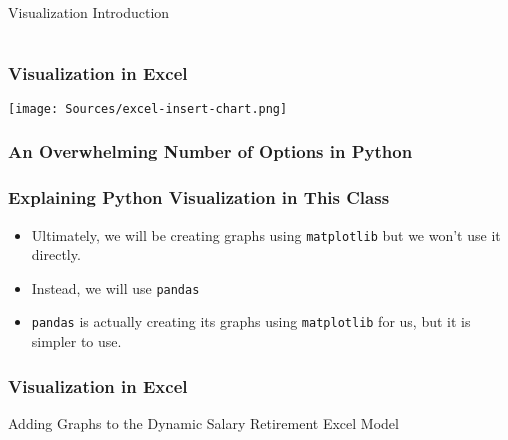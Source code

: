 \documentclass[handout, 11pt]{beamer}
\begin{document}
\begin{section}[Intro]{Visualization Introduction}
\begin{frame}
\begin{center}
\begin{tabular}{lcc}
\end{tabular}
\end{center}
\end{frame}
\begin{frame}
\frametitle{Visualization in Excel}
\begin{center}
\begin{adjustbox}{width=0.9\textwidth, height=0.8\textheight, keepaspectratio}
\texttt{[image: Sources/excel-insert-chart.png]}
\end{adjustbox}
\end{center}
\end{frame}
\begin{frame}
\frametitle{An Overwhelming Number of Options in Python}
\begin{center}
\begin{adjustbox}{width=0.9\textwidth, height=0.8\textheight, keepaspectratio}
\end{adjustbox}
\end{center}
\end{frame}
\begin{frame}
\frametitle{Explaining Python Visualization in This Class}
\begin{itemize}
\item Ultimately, we will be creating graphs using
\texttt{matplotlib}
but we won't use it directly.
\vfill
\item Instead, we will use
\texttt{pandas}
\vfill
\item \texttt{pandas}
is actually creating its graphs using
\texttt{matplotlib}
for us, but it is simpler to use.
\end{itemize}
\end{frame}
\begin{frame}
\frametitle{Visualization in Excel}
{
\begin{block}{Adding Graphs to the Dynamic Salary Retirement Excel Model}
\begin{itemize}

\end{itemize}
\end{block}}
\end{frame}
\end{section}
\end{document}
